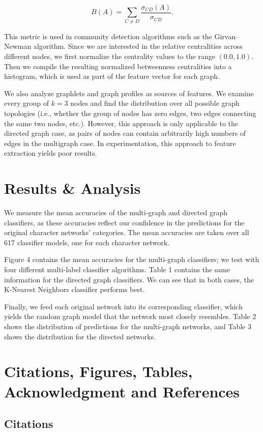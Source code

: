 \documentclass{article} %
\begin{document}
\[
B(A) = \sum_{C \neq D} \frac{\sigma_{CD}(A)}{\sigma_{CD}}.
\]

This metric is used in community detection algorithms such as the Girvan–Newman algorithm. Since we are interested in the relative centralities across different nodes, we first normalize the centrality values to the range \( (0.0, 1.0) \). Then we compile the resulting normalized betweenness centralities into a histogram, which is used as part of the feature vector for each graph.

We also analyze graphlets and graph profiles as sources of features. We examine every group of \( k = 3 \) nodes and find the distribution over all possible graph topologies (i.e., whether the group of nodes has zero edges, two edges connecting the same two nodes, etc.). However, this approach is only applicable to the directed graph case, as pairs of nodes can contain arbitrarily high numbers of edges in the multigraph case. In experimentation, this approach to feature extraction yields poor results.

\section{Results \& Analysis}

We measure the mean accuracies of the multi-graph and directed graph classifiers, as these accuracies reflect our confidence in the predictions for the original character networks’ categories. The mean accuracies are taken over all 617 classifier models, one for each character network.

Figure 4 contains the mean accuracies for the multi-graph classifiers; we test with four different multi-label classifier algorithms. Table 1 contains the same information for the directed graph classifiers. We can see that in both cases, the K-Nearest Neighbors classifier performs best.

Finally, we feed each original network into its corresponding classifier, which yields the random graph model that the network most closely resembles. Table 2 shows the distribution of predictions for the multi-graph networks, and Table 3 shows the distribution for the directed networks.

\section{Citations, Figures, Tables, Acknowledgment and References}
\label{others}

\subsection{Citations}
\end{document}
